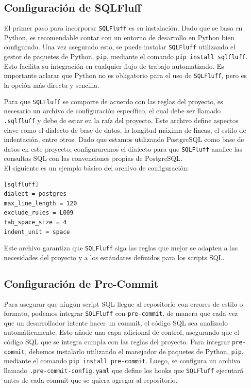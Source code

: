 \documentclass{IEEEtran}
\begin{document}
\subsection{Configuración de SQLFluff}

El primer paso para incorporar \texttt{SQLFluff} es su instalación. Dado que se basa en Python, es recomendable contar con un entorno de desarrollo en Python bien configurado. Una vez asegurado esto, se puede instalar \texttt{SQLFluff} utilizando el gestor de paquetes de Python, \texttt{pip}, mediante el comando \texttt{pip install sqlfluff}. Esto facilita su integración en cualquier flujo de trabajo automatizado. Es importante aclarar que Python no es obligatorio para el uso de \texttt{SQLFluff}, pero es la opción más directa y sencilla.

Para que \texttt{SQLFluff} se comporte de acuerdo con las reglas del proyecto, es necesario un archivo de configuración específico, el cual debe ser llamado \texttt{.sqlfluff} y debe de estar en la raíz del proyecto. Este archivo define aspectos clave como el dialecto de base de datos, la longitud máxima de líneas, el estilo de indentación, entre otros. Dado que estamos utilizando PostgreSQL como base de datos en este proyecto, configuraremos el dialecto para que \texttt{SQLFluff} analice las consultas SQL con las convenciones propias de PostgreSQL.\\ El siguiente es un ejemplo básico del archivo de configuración:

\begin{verbatim}
[sqlfluff]
dialect = postgres           
max_line_length = 120
exclude_rules = L009
tab_space_size = 4  
indent_unit = space          
\end{verbatim}

Este archivo garantiza que \texttt{SQLFluff} siga las reglas que mejor se adapten a las necesidades del proyecto y a los estándares definidos para los scripts SQL.

\subsection{Configuración de Pre-Commit}

Para asegurar que ningún script SQL llegue al repositorio con errores de estilo o formato, podemos integrar \texttt{SQLFluff} con \texttt{pre-commit}, de manera que cada vez que un desarrollador intente hacer un commit, el código SQL sea analizado automáticamente. Esto añade una capa adicional de control, asegurando que el código SQL que se integra cumpla con las reglas del proyecto. Para integrar \texttt{pre-commit}, debemos instalarlo utilizando el manejador de paquetes de Python, \texttt{pip}, mediante el comando \texttt{pip install pre-commit}. Luego, se configura un archivo llamado \texttt{.pre-commit-config.yaml} que define los hooks que \texttt{SQLFluff} ejecutará antes de cada commit que se quiera agregar al repositorio.
\end{document}
